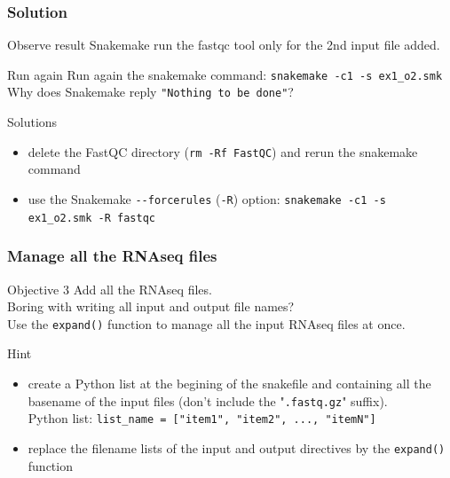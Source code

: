 \begin{frame}[containsverbatim]
\frametitle{Solution}
\begin{exampleblock}{Observe result}
Snakemake run the fastqc tool only for the 2nd input file added. 
\end{exampleblock}

\begin{exampleblock}{Run again}
Run again the snakemake command: \verb|snakemake -c1 -s ex1_o2.smk|\\

Why does Snakemake reply \verb|"Nothing to be done"|?
\end{exampleblock}

\begin{exampleblock}{Solutions}
\begin{itemize}
   \item delete the FastQC directory (\verb|rm -Rf FastQC|) and rerun the snakemake command
   \item use the Snakemake \verb|--forcerules| (\verb|-R|) option: \verb|snakemake -c1 -s ex1_o2.smk -R fastqc|
\end{itemize}
\end{exampleblock}
\end{frame}
\begin{frame}[containsverbatim]
\frametitle{Manage all the RNAseq files}
\begin{exampleblock}{Objective 3}
Add all the RNAseq files.\\
Boring with writing all input and output file names? \\
Use the \verb|expand()| function to manage all the input RNAseq files at once.
\end{exampleblock}
\begin{exampleblock}{Hint}
\begin{itemize}
    \item create a Python list at the begining of the snakefile and containing all the basename of the input files (don't include the "\verb|.fastq.gz|" suffix).\\
    Python list: \verb|list_name = ["item1", "item2", ..., "itemN"]|
    \item replace the filename lists of the input and output directives by the \verb|expand()| function
\end{itemize}
\end{exampleblock}
\end{frame}

